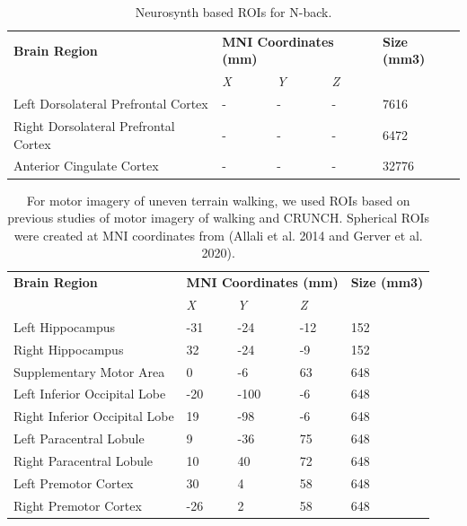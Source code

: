 \documentclass[a4paper,fleqn]{cas-sc}
\begin{document}
\begin{table}[]
\caption{Neurosynth based ROIs for N-back.}\label{tab:ROI_neurosynth}
\begin{tabular}{lllll}
\textbf{Brain Region}                & \multicolumn{3}{l}{\textbf{MNI Coordinates (mm)}} & \textbf{Size (mm3)} \\
                                     & \textit{X}      & \textit{Y}     & \textit{Z}     &                     \\
Left Dorsolateral Prefrontal Cortex  & -               & -              & -              & 7616                \\
Right Dorsolateral Prefrontal Cortex & -               & -              & -              & 6472                \\
Anterior Cingulate Cortex            & -               & -              & -              & 32776              
\end{tabular}
\end{table}

\begin{table}[]
\caption{For motor imagery of uneven terrain walking, we used ROIs based on previous studies of motor imagery of walking and CRUNCH. Spherical ROIs were created at MNI coordinates from (Allali et al. 2014 and Gerver et al. 2020). }\label{tab:ROI_coords}
\begin{tabular}{lllll}
\textbf{Brain Region}         & \multicolumn{3}{l}{\textbf{MNI Coordinates (mm)}} & \textbf{Size (mm3)} \\
                              & \textit{X}      & \textit{Y}     & \textit{Z}     &                     \\
Left Hippocampus              & -31             & -24            & -12            & 152                 \\
Right Hippocampus             & 32              & -24            & -9             & 152                 \\
Supplementary Motor Area      & 0               & -6             & 63             & 648                 \\
Left Inferior Occipital Lobe  & -20             & -100           & -6             & 648                 \\
Right Inferior Occipital Lobe & 19              & -98            & -6             & 648                 \\
Left Paracentral Lobule       & 9               & -36            & 75             & 648                 \\
Right Paracentral Lobule      & 10              & 40             & 72             & 648                 \\
Left Premotor Cortex          & 30              & 4              & 58             & 648                 \\
Right Premotor Cortex         & -26             & 2              & 58             & 648                
\end{tabular}

\end{table}
\end{document}
